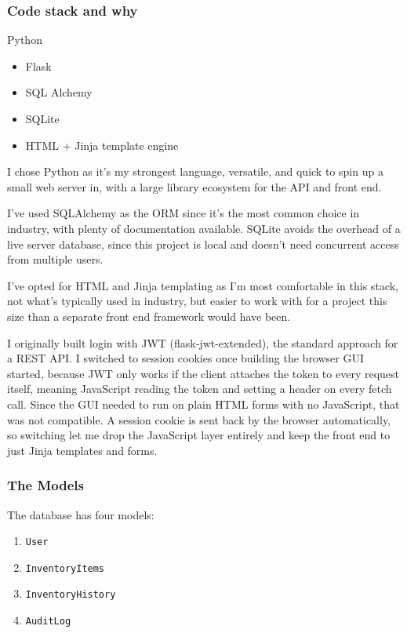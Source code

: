 \documentclass[12pt,a4paper]{article}
\begin{document}
\subsubsection{Code stack and why}

Python

\begin{itemize}
    \item Flask
    \item SQL Alchemy
    \item SQLite
    \item HTML + Jinja template engine
\end{itemize}

I chose Python as it's my strongest language, versatile, and quick to spin up a small web server in, with a large library ecosystem for the API and front end.

I've used SQLAlchemy as the ORM since it's the most common choice in industry, with plenty of documentation available. SQLite avoids the overhead of a live server database, since this project is local and doesn't need concurrent access from multiple users.

I've opted for HTML and Jinja templating as I'm most comfortable in this stack, not what's typically used in industry, but easier to work with for a project this size than a separate front end framework would have been.

I originally built login with JWT (flask-jwt-extended), the standard approach for a REST API. I switched to session cookies once building the browser GUI started, because JWT only works if the client attaches the token to every request itself, meaning JavaScript reading the token and setting a header on every fetch call. Since the GUI needed to run on plain HTML forms with no JavaScript, that was not compatible. A session cookie is sent back by the browser automatically, so switching let me drop the JavaScript layer entirely and keep the front end to just Jinja templates and forms.

\subsubsection{The Models}

The database has four models:
\begin{enumerate}
    \item \lstinline|User|
    \item \lstinline|InventoryItems|
    \item \lstinline|InventoryHistory|
    \item \lstinline|AuditLog|
\end{enumerate}
\end{document}
